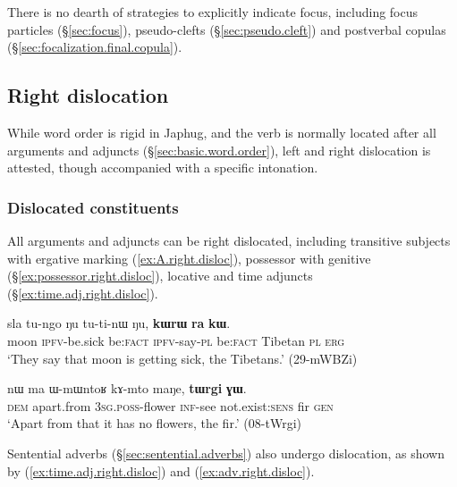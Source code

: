 There is no dearth of strategies to explicitly indicate focus, including focus particles (§\ref{sec:focus}), pseudo-clefts (§\ref{sec:pseudo.cleft}) and postverbal copulas (§\ref{sec:focalization.final.copula}).

\subsection{Right dislocation} \label{sec:right.dislocation}
 
While word order is rigid in Japhug, and the verb is normally located after all arguments and adjuncts (§\ref{sec:basic.word.order}), left and right dislocation is attested, though accompanied with a specific intonation.

\subsubsection{Dislocated constituents}
All arguments and adjuncts can be right dislocated, including transitive subjects with ergative marking (\ref{ex:A.right.disloc}), possessor with genitive (§\ref{ex:possessor.right.disloc}), locative and time adjuncts (§\ref{ex:time.adj.right.disloc}).


\begin{exe}
\ex \label{ex:A.right.disloc}
\gll sla tu-ngo ŋu tu-ti-nɯ ŋu, \textbf{kɯrɯ} \textbf{ra} \textbf{kɯ}. \\
moon \textsc{ipfv}-be.sick be:\textsc{fact} \textsc{ipfv}-say-\textsc{pl} be:\textsc{fact} Tibetan \textsc{pl} \textsc{erg} \\
\glt `They say that moon is getting sick, the Tibetans.' (29-mWBZi)
\end{exe}


\begin{exe}
\ex \label{ex:possessor.right.disloc}
\gll nɯ ma ɯ-mɯntoʁ kɤ-mto maŋe, \textbf{tɯrgi} \textbf{ɣɯ}. \\
\textsc{dem} apart.from \textsc{3sg}.\textsc{poss}-flower \textsc{inf}-see not.exist:\textsc{sens} fir \textsc{gen} \\
\glt `Apart from that it has no flowers, the fir.' (08-tWrgi) 
\end{exe}

Sentential adverbs (§\ref{sec:sentential.adverbs}) also undergo dislocation, as shown by (\ref{ex:time.adj.right.disloc}) and (\ref{ex:adv.right.disloc}).

